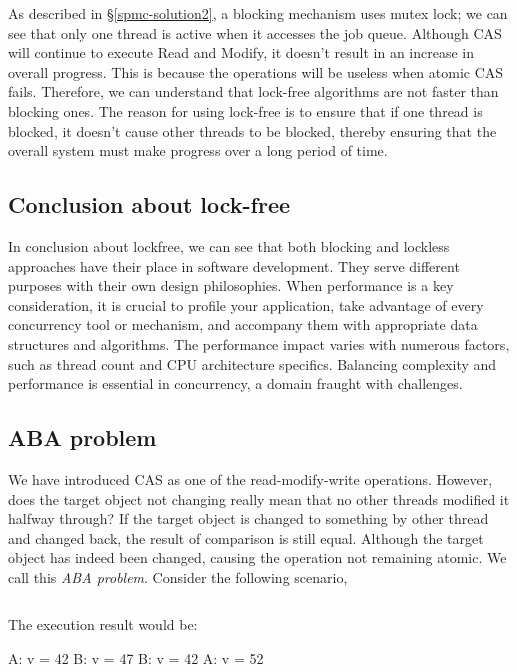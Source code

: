 \documentclass[fontsize=10pt, oneside]{scrartcl}
\newcommand{\introduce}[1]{\textit{#1}}
\newcommand{\secref}[1]{\hyperref[#1]{\textsc{\S}\ref*{#1}}}
\begin{document}
As described in \secref{spmc-solution2}, a blocking mechanism uses mutex lock; 
we can see that only one thread is active when it accesses the job queue. 
Although \textsc{CAS} will continue to execute Read and Modify, 
it doesn't result in an increase in overall progress. 
This is because the operations will be useless when atomic \textsc{CAS} fails. 
Therefore, we can understand that lock-free algorithms are not faster than blocking ones. 
The reason for using lock-free is to ensure that if one thread is blocked, 
it doesn't cause other threads to be blocked, 
thereby ensuring that the overall system must make progress over a long period of time.

\subsection{Conclusion about lock-free}
In conclusion about lockfree, 
we can see that both blocking and lockless approaches have their place in software development. 
They serve different purposes with their own design philosophies. 
When performance is a key consideration, it is crucial to profile your application, 
take advantage of every concurrency tool or mechanism, and accompany them with appropriate data structures and algorithms. 
The performance impact varies with numerous factors, such as thread count and CPU architecture specifics. 
Balancing complexity and performance is essential in concurrency, 
a domain fraught with challenges.

\subsection{ABA problem}
We have introduced CAS as one of the read-modify-write operations.
However, does the target object not changing really mean that no other threads modified it halfway through?
If the target object is changed to something by other thread and changed back, the result of comparison is still equal.
Although the target object has indeed been changed, causing the operation not remaining atomic.
We call this \introduce{ABA problem}.
Consider the following scenario,

\inputminted{c}{./examples/simple_aba_example.c}

The execution result would be:

\begin{ccode}
    A: v = 42
    B: v = 47
    B: v = 42
    A: v = 52
\end{ccode}
\end{document}
